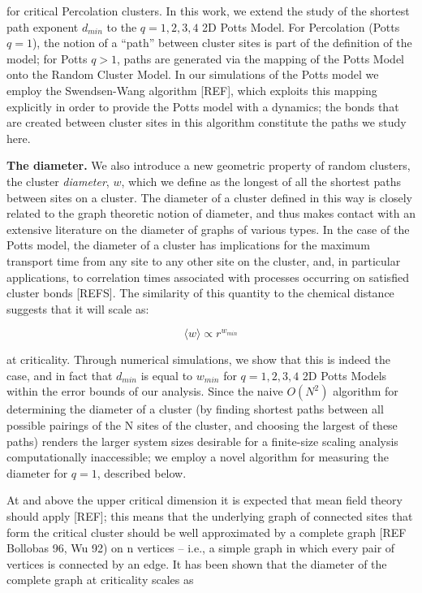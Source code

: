 \documentclass[pre,preprint,11pt]{revtex4}
\newcommand{\lb}{{\langle}}
\newcommand{\rb}{{\rangle}}
\begin{document}
for critical Percolation clusters. In this work, we extend the study of the shortest path exponent ${d_{min}}$ to the $q=1,2,3,4$ 2D Potts Model. For Percolation (Potts $q=1$), the notion of a ``path'' between cluster sites is part of the definition of the model; for Potts $q>1$, paths are generated via the mapping of the Potts Model onto the Random Cluster Model.  In our simulations of the Potts model we employ the Swendsen-Wang algorithm [REF], which exploits this mapping explicitly in order to provide the Potts model with a dynamics; the bonds that are created between cluster sites in this algorithm constitute the paths we study here.

{\bf The diameter.} We also introduce a new geometric property of random clusters, the cluster {\it diameter}, $w$, which we define as the longest of all the shortest paths between sites on a cluster. The diameter of a cluster defined in this way is closely related to the graph theoretic notion of diameter, and thus makes contact with an extensive literature on the diameter of graphs of various types. In the case of the Potts model, the diameter of a cluster has implications for the maximum transport time from any site to any other site on the cluster, and, in particular applications, to correlation times associated with processes occurring on satisfied cluster bonds [REFS].  The similarity of this quantity to the chemical distance suggests that it will scale as:

\begin{equation}
\lb w \rb \propto r^{w_{min}}
\end{equation}

at criticality. Through numerical simulations, we show that this is indeed the case, and in fact that $d_{min}$ is equal to $w_{min}$ for $q=1,2,3,4$ 2D Potts Models within the error bounds of our analysis.   Since the naive $O(N^2)$ algorithm for determining the diameter of a cluster (by finding shortest paths between all possible pairings of the N sites of the cluster, and choosing the largest of these paths) renders the larger system sizes desirable for a finite-size scaling analysis computationally inaccessible; we employ a novel algorithm for measuring the diameter for $q=1$, described below.

At and above the upper critical dimension it is expected that mean field theory should apply [REF]; this means that the underlying graph of connected sites that form the critical cluster should be well approximated by a complete graph [REF Bollobas 96, Wu 92) on n vertices -- i.e., a simple graph in which every pair of vertices is connected by an edge. It has been shown \cite{Nachmiasa} that the diameter of the complete graph at criticality scales as
\end{document}
